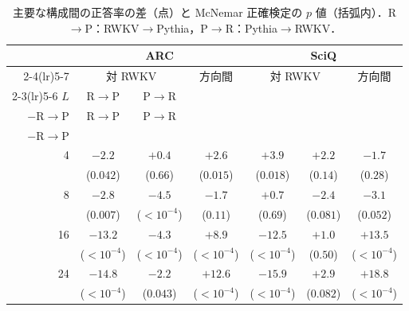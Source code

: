 \documentclass[techrep,noauthor]{ipsj}
\newcommand{\rev}[1]{{\color{blue}#1}}
\newcommand{\revp}[1]{{\color{violet}#1}}
\begin{document}
\begin{table}[!t]\centering\small
\caption{\rev{主要な構成間の正答率の差（点）と McNemar 正確検定の $p$ 値（括弧内）．R$\to$P：RWKV$\to$Pythia，P$\to$R：Pythia$\to$RWKV．}}\label{tab:paired}
\setlength{\tabcolsep}{1.6pt}
{\color{blue}
\begin{tabular}{rcccccc}\toprule
& \multicolumn{3}{c}{\revp{ARC}} & \multicolumn{3}{c}{SciQ}\\
\cmidrule(lr){2-4}\cmidrule(lr){5-7}
& \multicolumn{2}{c}{対 RWKV} & 方向間 & \multicolumn{2}{c}{対 RWKV} & 方向間\\
\cmidrule(lr){2-3}\cmidrule(lr){5-6}
$L$ & \textsf{R$\to$P} & \textsf{P$\to$R} & \shortstack{\textsf{P$\to$R}\\$-$\textsf{R$\to$P}} & \textsf{R$\to$P} & \textsf{P$\to$R} & \shortstack{\textsf{P$\to$R}\\$-$\textsf{R$\to$P}}\\\midrule
4 & $-2.2$ & $+0.4$ & $+2.6$ & $+3.9$ & $+2.2$ & $-1.7$\\
   & ($0.042$) & ($0.66$) & ($0.015$) & ($0.018$) & ($0.14$) & ($0.28$)\\[2pt]
8 & $-2.8$ & $-4.5$ & $-1.7$ & $+0.7$ & $-2.4$ & $-3.1$\\
   & ($0.007$) & ($<10^{-4}$) & ($0.11$) & ($0.69$) & ($0.081$) & ($0.052$)\\[2pt]
16 & $-13.2$ & $-4.3$ & $+8.9$ & $-12.5$ & $+1.0$ & $+13.5$\\
   & ($<10^{-4}$) & ($<10^{-4}$) & ($<10^{-4}$) & ($<10^{-4}$) & ($0.50$) & ($<10^{-4}$)\\[2pt]
24 & $-14.8$ & $-2.2$ & $+12.6$ & $-15.9$ & $+2.9$ & $+18.8$\\
   & ($<10^{-4}$) & ($0.043$) & ($<10^{-4}$) & ($<10^{-4}$) & ($0.082$) & ($<10^{-4}$)\\[2pt]
\bottomrule
\end{tabular}}
\end{table}
\end{document}
